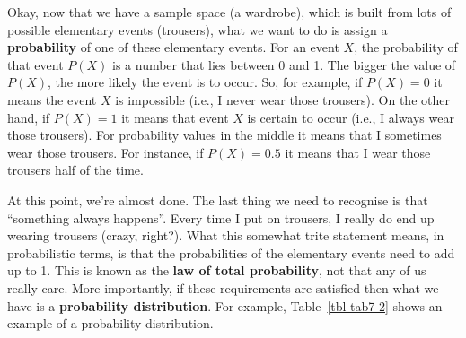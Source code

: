 \documentclass[
  letterpaper,
]{book}
\begin{document}
Okay, now that we have a sample space (a wardrobe), which is built from
lots of possible elementary events (trousers), what we want to do is
assign a \textbf{probability} of one of these elementary events. For an
event \(X\), the probability of that event \(P(X)\) is a number that
lies between 0 and 1. The bigger the value of \(P(X)\), the more likely
the event is to occur. So, for example, if \(P(X) = 0\) it means the
event \(X\) is impossible (i.e., I never wear those trousers). On the
other hand, if \(P(X) = 1\) it means that event \(X\) is certain to
occur (i.e., I always wear those trousers). For probability values in
the middle it means that I sometimes wear those trousers. For instance,
if \(P(X) = 0.5\) it means that I wear those trousers half of the time.

At this point, we're almost done. The last thing we need to recognise is
that ``something always happens''. Every time I put on trousers, I
really do end up wearing trousers (crazy, right?). What this somewhat
trite statement means, in probabilistic terms, is that the probabilities
of the elementary events need to add up to 1. This is known as the
\textbf{law of total probability}, not that any of us really care. More
importantly, if these requirements are satisfied then what we have is a
\textbf{probability distribution}. For example, Table~\ref{tbl-tab7-2}
shows an example of a probability distribution.

\hypertarget{tbl-tab7-2}{}
 
  \providecommand{\huxb}[2]{\arrayrulecolor[RGB]{#1}\global\arrayrulewidth=#2pt}
  \providecommand{\huxvb}[2]{\color[RGB]{#1}\vrule width #2pt}
  \providecommand{\huxtpad}[1]{\rule{0pt}{#1}}
  \providecommand{\huxbpad}[1]{\rule[-#1]{0pt}{#1}}
\end{document}
